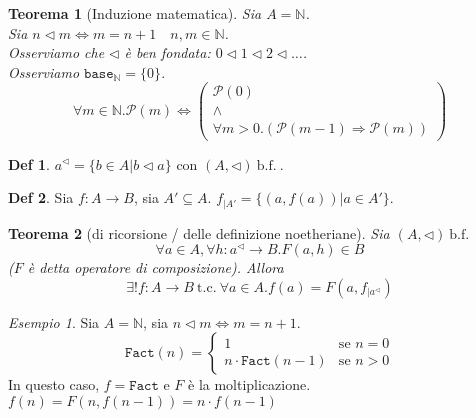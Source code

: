 \documentclass[a4paper]{report}
\newcommand{\bnfn}{\ \mathrm{b.f.}\ }
\newcommand{\tc}{\ \mathrm{t.c.}\ }
\newcommand{\prop}{\mathcal{P}}
\newcommand{\base}[1]{\mathtt{base}_{#1}}
\theoremstyle{definition} \newtheorem*{defi}{Def}
\theoremstyle{plain} \newtheorem{lemma}{Lemma}
\theoremstyle{plain} \newtheorem{teo}{Teorema}
\theoremstyle{remark} \newtheorem*{es}{Esempio}
\begin{document}
\begin{teo}[Induzione matematica]
  Sia $A=\mathbb{N}$.\\
  Sia $n \lhd m \Leftrightarrow m=n+1 \quad n,m \in \mathbb{N}$.\\
  Osserviamo che $\lhd$ è ben fondata: $0\lhd1\lhd2\lhd\dots$.\\
  Osserviamo $\base{\mathbb{N}}=\{0\}$.
  \[
    \forall m \in \mathbb{N}.\prop(m) \Leftrightarrow 
    \begin{pmatrix} 
      \prop(0)\\
      \wedge\\
      \forall m > 0
      .(\prop(m-1) \Rightarrow \prop(m))
    \end{pmatrix}
  \]
\end{teo}

\begin{defi}
  $a^\lhd=\{b \in A|b \lhd a\}$ con $(A,\lhd)\bnfn$.
\end{defi}
\begin{defi}
  Sia $f: A \rightarrow B$, sia $A' \subseteq A$.
  $f_{|A'}=\{(a, f(a))|a \in A'\}$.
\end{defi}

\begin{teo}[di ricorsione / delle definizione noetheriane]
  Sia $(A,\lhd)\bnfn$
  \[
    \forall a \in A, \forall h:a^\lhd \rightarrow B.
    F(a,h) \in B
  \]
  ($F$ è detta \emph{operatore di composizione}). Allora
  \[
    \exists! f: A \rightarrow B \tc
    \forall a \in A.f(a)=F(a,f_{|a^\lhd})
  \]
\end{teo}
\begin{es}
  Sia $A=\mathbb{N}$, sia $n \lhd m \Leftrightarrow m=n+1$.\\
  \[
    \mathtt{Fact}(n)=
    \begin{cases}
      1 & \text{se } n=0\\
      n \cdot \mathtt{Fact}(n-1) & \text{se } n>0
    \end{cases}
  \]
  In questo caso, $f = \mathtt{Fact}$ e $F$ è la moltiplicazione.\\
  $f(n)=F(n,f(n-1))=n \cdot f(n-1)$
\end{es}
\end{document}
